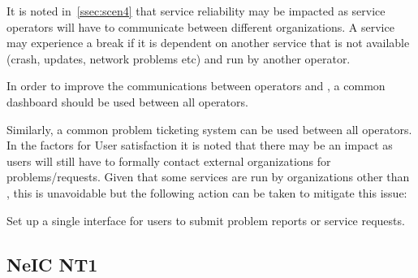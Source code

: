 \documentclass[12pt,a4paper]{article}
\newcommand{\nnt}{NeIC NT1\xspace}
\begin{document}
It is noted in~\ref{ssec:scen4} that service reliability may be impacted as service operators will have to communicate between different organizations.
A service may experience a break if it is dependent on another service that is not available (crash, updates, network problems etc) and run by another operator.
\bitm
\item In order to improve the communications between operators and \ED, a common dashboard should be used between all operators.
\item Similarly, a common problem ticketing system can be used between all operators.
\eitm
In the factors for User satisfaction it is noted that there may be an impact as \ED users will still have to formally contact external organizations for problems/requests. 
Given that some services are run by organizations other than \EC, this is unavoidable but the following action can be taken to mitigate this issue:
\bitm
\item Set up a single interface for \ED users to submit problem reports or service requests.
\eitm



\subsection{\nnt}
\label{ssec:nt1}
\end{document}
